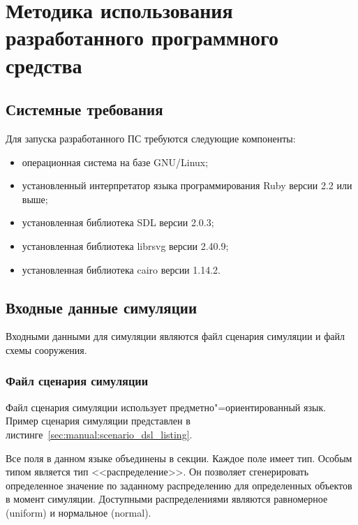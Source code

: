 \section{Методика использования разработанного программного средства}
\label{sec:manual}

\subsection{Системные требования}
\label{sec:manual:requirements}

Для запуска разработанного ПС требуются следующие компоненты:
\begin{itemize}
  \item операционная система на базе GNU/Linux;
  \item установленный интерпретатор языка программирования Ruby версии 2.2 или выше;
  \item установленная библиотека SDL версии 2.0.3;
  \item установленная библиотека librsvg версии 2.40.9;
  \item установленная библиотека cairo версии 1.14.2.
\end{itemize}

\subsection{Входные данные симуляции}
\label{sec:manual:input}

Входными данными для симуляции являются файл сценария симуляции и файл схемы сооружения.

\subsubsection{Файл сценария симуляции}
\label{sec:manual:input:scenario}

Файл сценария симуляции использует предметно"=ориентированный язык.
Пример сценария симуляции представлен в листинге~\ref{sec:manual:scenario_dsl_listing}.



Все поля в данном языке объединены в секции.
Каждое поле имеет тип. Особым типом является тип <<распределение>>.
Он позволяет сгенерировать определенное значение по заданному распределению для определенных объектов в момент симуляции.
Доступными распределениями являются равномерное (uniform) и нормальное (normal).

